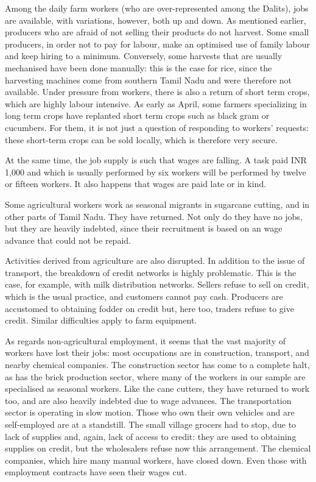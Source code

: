\documentclass[a4paper, 11pt, onecolumn]{article}
\begin{document}
Among the daily farm workers (who are over-represented among the Dalits), jobs are available, with variations, however, both up and down. 
As mentioned earlier, producers who are afraid of not selling their products do not harvest. 
Some small producers, in order not to pay for labour, make an optimised use of family labour and keep hiring to a minimum. 
Conversely, some harvests that are usually mechanised have been done manually: this is the case for rice, since the harvesting machines come from southern Tamil Nadu and were therefore not available. 
Under pressure from workers, there is also a return of short term crops, which are highly labour intensive. 
As early as April, some farmers specializing in long term crops have replanted short term crops such as black gram or cucumbers. 
For them, it is not just a question of responding to workers' requests: these short-term crops can be sold locally, which is therefore very secure. 

At the same time, the job supply is such that wages are falling. 
A task paid INR 1,000 and which is usually performed by six workers will be performed by twelve or fifteen workers. 
It also happens that wages are paid late or in kind. 

Some agricultural workers work as seasonal migrants in sugarcane cutting, and in other parts of Tamil Nadu. 
They have returned. 
Not only do they have no jobs, but they are heavily indebted, since their recruitment is based on an wage advance that could not be repaid.

Activities derived from agriculture are also disrupted. 
In addition to the issue of transport, the breakdown of credit networks is highly problematic. 
This is the case, for example, with milk distribution networks. 
Sellers refuse to sell on credit, which is the usual practice, and customers cannot pay cash. 
Producers are accustomed to obtaining fodder on credit but, here too, traders refuse to give credit. 
Similar difficulties apply to farm equipment. 

As regards non-agricultural employment, it seems that the vast majority of workers have lost their jobs: most occupations are in construction, transport, and nearby chemical companies. 
The construction sector has come to a complete halt, as has the brick production sector, where many of the workers in our sample are specialised as seasonal workers. Like the cane cutters, they have returned to work too, and are also heavily indebted due to wage advances. 
The transportation sector is operating in slow motion. 
Those who own their own vehicles and are self-employed are at a standstill. 
The small village grocers had to stop, due to lack of supplies and, again, lack of access to credit: they are used to obtaining supplies on credit, but the wholesalers refuse now this arrangement. 
The chemical companies, which hire many manual workers, have closed down. 
Even those with employment contracts have seen their wages cut.
\end{document}
